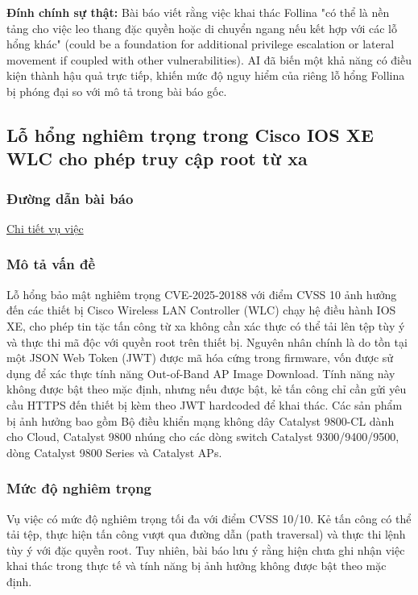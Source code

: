 \textbf{Đính chính sự thật:}
Bài báo viết rằng việc khai thác Follina "có thể là nền tảng cho việc leo thang đặc quyền hoặc di chuyển ngang nếu kết hợp với các lỗ hổng khác" (could be a foundation for additional privilege escalation or lateral movement if coupled with other vulnerabilities). AI đã biến một khả năng có điều kiện thành hậu quả trực tiếp, khiến mức độ nguy hiểm của riêng lỗ hổng Follina bị phóng đại so với mô tả trong bài báo gốc.


\subsection{Lỗ hổng nghiêm trọng trong Cisco IOS XE WLC cho phép truy cập root từ xa}

\subsubsection{Đường dẫn bài báo}
\href{https://whitehat.vn/threads/lo-hong-nghiem-trong-trong-cisco-ios-xe-wlc-cho-phep-truy-cap-root-tu-xa.18329/}{Chi tiết vụ việc}

\subsubsection{Mô tả vấn đề}
Lỗ hổng bảo mật nghiêm trọng CVE-2025-20188 với điểm CVSS 10 ảnh hưởng đến các thiết bị Cisco Wireless LAN Controller (WLC) chạy hệ điều hành IOS XE, cho phép tin tặc tấn công từ xa không cần xác thực có thể tải lên tệp tùy ý và thực thi mã độc với quyền root trên thiết bị. Nguyên nhân chính là do tồn tại một JSON Web Token (JWT) được mã hóa cứng trong firmware, vốn được sử dụng để xác thực tính năng Out-of-Band AP Image Download. Tính năng này không được bật theo mặc định, nhưng nếu được bật, kẻ tấn công chỉ cần gửi yêu cầu HTTPS đến thiết bị kèm theo JWT hardcoded để khai thác. Các sản phẩm bị ảnh hưởng bao gồm Bộ điều khiển mạng không dây Catalyst 9800-CL dành cho Cloud, Catalyst 9800 nhúng cho các dòng switch Catalyst 9300/9400/9500, dòng Catalyst 9800 Series và Catalyst APs.

\subsubsection{Mức độ nghiêm trọng}
Vụ việc có mức độ nghiêm trọng tối đa với điểm CVSS 10/10. Kẻ tấn công có thể tải tệp, thực hiện tấn công vượt qua đường dẫn (path traversal) và thực thi lệnh tùy ý với đặc quyền root. Tuy nhiên, bài báo lưu ý rằng hiện chưa ghi nhận việc khai thác trong thực tế và tính năng bị ảnh hưởng không được bật theo mặc định.

